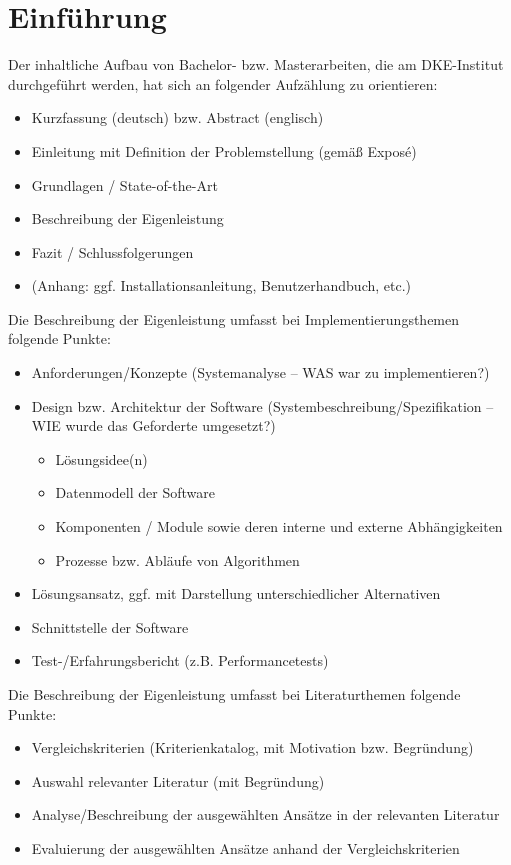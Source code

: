 
\chapter{Einführung}
\label{chap:introduction}

Der inhaltliche Aufbau von Bachelor- bzw. Masterarbeiten, die am DKE-Institut durchgeführt werden, hat sich an folgender Aufzählung zu orientieren:

\begin{itemize}
	\item Kurzfassung (deutsch) bzw. Abstract (englisch)
	\item Einleitung mit Definition der Problemstellung (gemäß Exposé)
	\item Grundlagen / State-of-the-Art
	\item Beschreibung der Eigenleistung
	\item Fazit / Schlussfolgerungen
	\item (Anhang: ggf. Installationsanleitung, Benutzerhandbuch, etc.)
\end{itemize}

Die Beschreibung der Eigenleistung umfasst bei Implementierungsthemen folgende Punkte:

\begin{itemize}
	\item Anforderungen/Konzepte (Systemanalyse – WAS war zu implementieren?)
	\item Design bzw. Architektur der Software (Systembeschreibung/Spezifikation – WIE wurde das Geforderte umgesetzt?)
		\begin{itemize}
			\item Lösungsidee(n)
			\item Datenmodell der Software
			\item Komponenten / Module sowie deren interne und externe Abhängigkeiten
			\item Prozesse bzw. Abläufe von Algorithmen
		\end{itemize}
	\item Lösungsansatz, ggf. mit Darstellung unterschiedlicher Alternativen
	\item Schnittstelle der Software
	\item Test-/Erfahrungsbericht (z.B. Performancetests)
\end{itemize}

Die Beschreibung der Eigenleistung umfasst bei Literaturthemen folgende Punkte:

\begin{itemize}
	\item Vergleichskriterien (Kriterienkatalog, mit Motivation bzw. Begründung)
	\item Auswahl relevanter Literatur (mit Begründung)
	\item Analyse/Beschreibung der ausgewählten Ansätze in der relevanten Literatur
	\item Evaluierung der ausgewählten Ansätze anhand der Vergleichskriterien
\end{itemize}